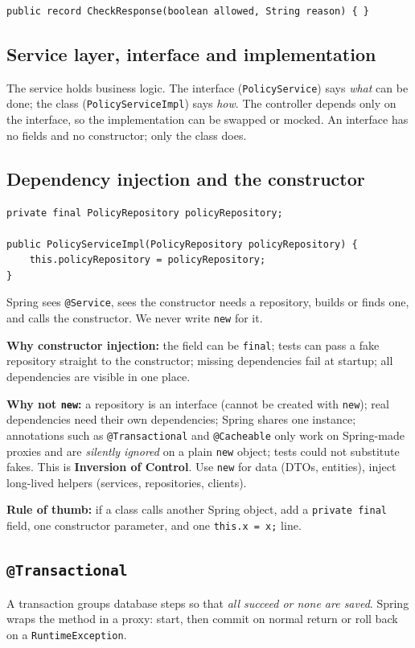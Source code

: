 \documentclass[11pt,a4paper]{article}
\newcommand{\code}[1]{\texttt{\small #1}}
\begin{document}
\begin{lstlisting}[style=java]
public record CheckResponse(boolean allowed, String reason) { }
\end{lstlisting}

\subsection{Service layer, interface and implementation}
The service holds business logic. The interface (\code{PolicyService}) says \emph{what}
can be done; the class (\code{PolicyServiceImpl}) says \emph{how}. The controller depends
only on the interface, so the implementation can be swapped or mocked. An interface has no
fields and no constructor; only the class does.

\subsection{Dependency injection and the constructor}
\begin{lstlisting}[style=java]
private final PolicyRepository policyRepository;

public PolicyServiceImpl(PolicyRepository policyRepository) {
    this.policyRepository = policyRepository;
}
\end{lstlisting}
Spring sees \code{@Service}, sees the constructor needs a repository, builds or finds one,
and calls the constructor. We never write \code{new} for it.

\textbf{Why constructor injection:} the field can be \code{final}; tests can pass a fake
repository straight to the constructor; missing dependencies fail at startup; all
dependencies are visible in one place.

\textbf{Why not \code{new}:} a repository is an interface (cannot be created with \code{new});
real dependencies need their own dependencies; Spring shares one instance; annotations such as
\code{@Transactional} and \code{@Cacheable} only work on Spring-made proxies and are
\emph{silently ignored} on a plain \code{new} object; tests could not substitute fakes.
This is \textbf{Inversion of Control}. Use \code{new} for data (DTOs, entities), inject
long-lived helpers (services, repositories, clients).

\textbf{Rule of thumb:} if a class calls another Spring object, add a \code{private final}
field, one constructor parameter, and one \code{this.x = x;} line.

\subsection{\texttt{@Transactional}}
A transaction groups database steps so that \emph{all succeed or none are saved}.
Spring wraps the method in a proxy: start, then commit on normal return or roll back on a
\code{RuntimeException}.
\end{document}
